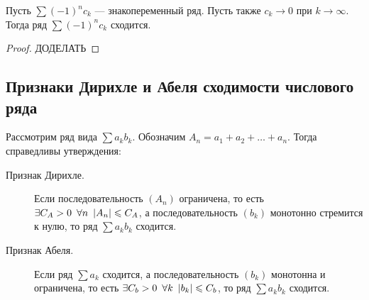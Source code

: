 \begin{theorem}
	Пусть \(\sum (-1)^n c_k\) --- знакопеременный ряд. Пусть также \(c_k \to 0\) при  \(k \to \infty\). Тогда ряд \(\sum (-1)^n c_k\) сходится.
\end{theorem}
\begin{proof}
	ДОДЕЛАТЬ
\end{proof}

\subsection{Признаки Дирихле и Абеля сходимости числового ряда}

\begin{theorem}
	Рассмотрим ряд вида \(\sum a_k b_k\). Обозначим \(A_n = a_1 + a_2 + \ldots + a_n\). Тогда справедливы утверждения:
	\begin{description}
		\item[Признак Дирихле.] Если последовательность \((A_n)\) ограничена, то есть \(\exists C_A > 0 \enskip \forall n \enskip |A_n| \leqslant C_A\), а последовательность \((b_k)\) монотонно стремится к нулю, то ряд \(\sum a_k b_k\) сходится.
		\item[Признак Абеля.] Если ряд \(\sum a_k\) сходится, а последовательность \((b_k)\) монотонна и ограничена, то есть  \(\exists C_b > 0 \enskip \forall k \enskip |b_k| \leqslant C_b\), то ряд \(\sum a_k b_k\) сходится.
	\end{description}
\end{theorem}
